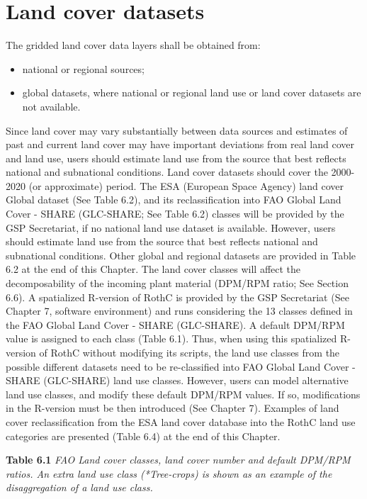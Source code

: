 \documentclass[
  10pt,
  b5paper,
]{book}
\providecommand{\tightlist}{%
  \setlength{\itemsep}{0pt}\setlength{\parskip}{0pt}}
\begin{document}
\hypertarget{land-cover-datasets}{%
\section{Land cover datasets}\label{land-cover-datasets}}

The gridded land cover data layers shall be obtained from:

\begin{itemize}
\tightlist
\item
  national or regional sources;
\item
  global datasets, where national or regional land use or land cover datasets are not available.
\end{itemize}

Since land cover may vary substantially between data sources and estimates of past and current land cover may have important deviations from real land cover and land use, users should estimate land use from the source that best reflects national and subnational conditions. Land cover datasets should cover the 2000-2020 (or approximate) period.
The ESA (European Space Agency) land cover Global dataset (See Table 6.2), and its reclassification into FAO Global Land Cover - SHARE (GLC-SHARE; See Table 6.2) classes will be provided by the GSP Secretariat, if no national land use dataset is available. However, users should estimate land use from the source that best reflects national and subnational conditions. Other global and regional datasets are provided in Table 6.2 at the end of this Chapter.
The land cover classes will affect the decomposability of the incoming plant material (DPM/RPM ratio; See Section 6.6). A spatialized R-version of RothC is provided by the GSP Secretariat (See Chapter 7, software environment) and runs considering the 13 classes defined in the FAO Global Land Cover - SHARE (GLC-SHARE). A default DPM/RPM value is assigned to each class (Table 6.1). Thus, when using this spatialized R-version of RothC without modifying its scripts, the land use classes from the possible different datasets need to be re-classified into FAO Global Land Cover - SHARE (GLC-SHARE) land use classes. However, users can model alternative land use classes, and modify these default DPM/RPM values. If so, modifications in the R-version must be then introduced (See Chapter 7). Examples of land cover reclassification from the ESA land cover database into the RothC land use categories are presented (Table 6.4) at the end of this Chapter.

\textbf{Table 6.1} \emph{FAO Land cover classes, land cover number and default DPM/RPM ratios. An extra land use class (*Tree-crops) is shown as an example of the disaggregation of a land use class.}
\end{document}
